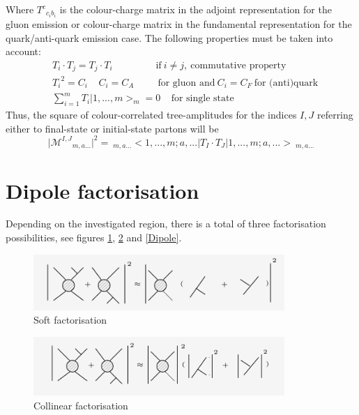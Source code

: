 Where $ {T^c}_{c_ib_i} $ is the colour-charge matrix in the adjoint representation for the gluon emission or colour-charge matrix in the fundamental representation for the quark/anti-quark emission case. The following properties must be taken into account:
\begin{equation}
\begin{split}
&T_i \cdot T_j = T_j \cdot T_i \:\:\:\:\:\:\:\:\:\:\:\:\:\:\:\:\:\:\:\:\text{if}\:i\neq j,\: \text{commutative property}\\
& {T_i}^2 = C_i\:\:\:\:\:C_i = C_A \:\:\:\:\:\:\:\:\:\:\:\text{for gluon and} \: C_i = C_F\:\text{for (anti)quark}\\
&\sum_{i=1}^m T_i |1,...,m>_m =0 \:\:\:\:\:\text{for single state}
\end{split}
\end{equation}
Thus, the square of colour-correlated tree-amplitudes for the indices $I,  J$ referring either to final-state or initial-state partons will be~\cite{Catani:1996vz, Catani:2002hc}
\begin{equation}
\vert {{\mathcal{M}}^{I,J}}_{m,a...} \vert^2=\:_{m,a...} < 1,...,m;a,... |T_I \cdot T_J | 1,...,m;a,... >\:_{m,a...}
\end{equation}

\section*{Dipole factorisation}
Depending on the investigated region, there is a total of three factorisation possibilities, see figures \ref{soft}, \ref{Collinear} and \ref{Dipole}.
\begin{figure}[h!]
\centering
\includegraphics[width=0.85\textwidth]{images/Intro/soft.png}
\caption{Soft factorisation}
\label{soft}
\end{figure}

\begin{figure}[h!]
\centering
\includegraphics[width=0.85\textwidth]{images/Intro/collinear.png}
\caption{Collinear factorisation}
\label{Collinear}
\end{figure}

